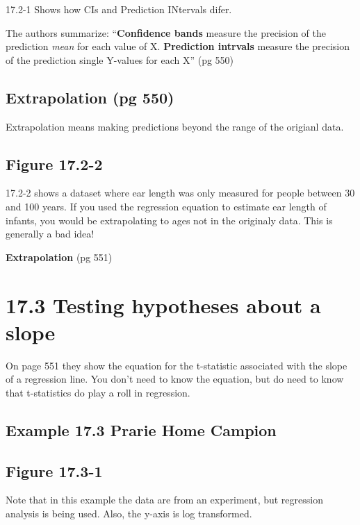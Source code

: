 \documentclass[]{book}
\theoremstyle{definition}
\theoremstyle{definition}
\theoremstyle{definition}
\theoremstyle{remark}
\begin{document}
17.2-1 Shows how CIs and Prediction INtervals difer.

The authors summarize: ``\textbf{Confidence bands} measure the precision
of the prediction \emph{mean} for each value of X. \textbf{Prediction
intrvals} measure the precision of the prediction single Y-values for
each X'' (pg 550)

\subsection{Extrapolation (pg 550)}\label{extrapolation-pg-550}

Extrapolation means making predictions beyond the range of the origianl
data.

\subsection{Figure 17.2-2}\label{figure-17.2-2}

17.2-2 shows a dataset where ear length was only measured for people
between 30 and 100 years. If you used the regression equation to
estimate ear length of infants, you would be extrapolating to ages not
in the originaly data. This is generally a bad idea!

\textbf{Extrapolation} (pg 551)

\section{17.3 Testing hypotheses about a
slope}\label{testing-hypotheses-about-a-slope}

On page 551 they show the equation for the t-statistic associated with
the slope of a regression line. You don't need to know the equation, but
do need to know that t-statistics do play a roll in regression.

\subsection{Example 17.3 Prarie Home
Campion}\label{example-17.3-prarie-home-campion}

\subsection{Figure 17.3-1}\label{figure-17.3-1}

Note that in this example the data are from an experiment, but
regression analysis is being used. Also, the y-axis is log transformed.
\end{document}
